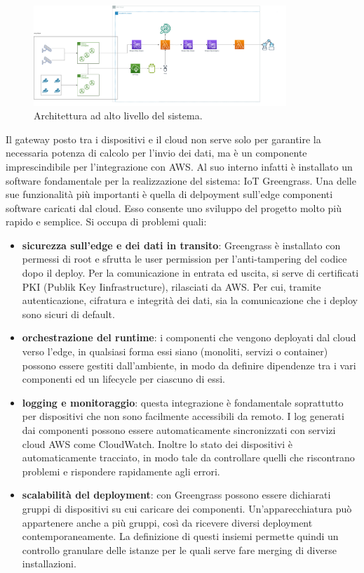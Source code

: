 \begin{figure}[htbp]
    \centering
    \includegraphics[width=0.85\textwidth]{figures/architettura.png}
    \caption{Architettura ad alto livello del sistema.} 
    \label{fig:architettura}
\end{figure}
 

Il gateway posto tra i dispositivi e il cloud non serve solo per garantire la necessaria potenza di calcolo per l’invio dei dati, ma è un componente imprescindibile per l’integrazione con AWS. Al suo interno infatti è installato un software fondamentale per la realizzazione del sistema: IoT Greengrass. Una delle sue funzionalità più importanti è quella di delpoyment sull'edge componenti software caricati dal cloud. Esso consente uno sviluppo del progetto molto più rapido e semplice. Si occupa di problemi quali: 

\newpage
\begin{itemize}
	\item \textbf{sicurezza sull’edge e dei dati in transito}: Greengrass è installato con permessi di root e sfrutta le user permission per l’anti-tampering del codice dopo il deploy. Per la comunicazione in entrata ed uscita, si serve di certificati PKI (Publik Key Iinfrastructure), rilasciati da AWS. Per cui, tramite autenticazione, cifratura e integrità dei dati, sia la comunicazione che i deploy sono sicuri di default.
	\item \textbf{orchestrazione del runtime}: i componenti che vengono deployati dal cloud verso l’edge, in qualsiasi forma essi siano (monoliti, servizi o container) possono essere gestiti dall’ambiente, in modo da definire dipendenze tra i vari componenti ed un lifecycle per ciascuno di essi.  
	\item \textbf{logging e monitoraggio}: questa integrazione è fondamentale soprattutto per dispositivi che non sono facilmente accessibili da remoto. I log generati dai componenti possono essere automaticamente sincronizzati con servizi cloud AWS come CloudWatch. Inoltre lo stato dei dispositivi è automaticamente tracciato, in modo tale da controllare quelli che riscontrano problemi e rispondere rapidamente agli errori.
	\item \textbf{scalabilità del deployment}: con Greengrass possono essere dichiarati gruppi di dispositivi su cui caricare dei componenti. Un'apparecchiatura può appartenere anche a più gruppi, così da ricevere diversi deployment contemporaneamente. La definizione di questi insiemi permette quindi un controllo granulare delle istanze per le quali serve fare merging di diverse installazioni.
\end{itemize}

